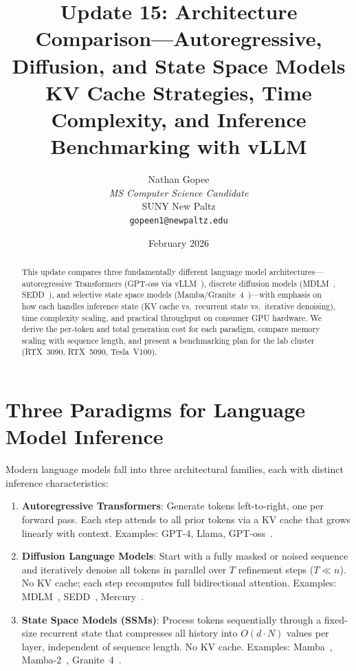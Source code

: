 \documentclass[11pt,letterpaper]{article}
\title{
    \vspace{-1cm}
    \textbf{Update 15: Architecture Comparison---Autoregressive, Diffusion, and State Space Models} \\[0.5em]
    \large KV Cache Strategies, Time Complexity, and Inference Benchmarking with vLLM
}
\author{
    Nathan Gopee \\
    \textit{MS Computer Science Candidate} \\
    SUNY New Paltz \\
    \texttt{gopeen1@newpaltz.edu}
}
\date{February 2026}
\begin{document}
\maketitle

\begin{abstract}
\noindent
This update compares three fundamentally different language model architectures---autoregressive Transformers (GPT-oss via vLLM~\cite{vllm,gptoss}), discrete diffusion models (MDLM~\cite{mdlm}, SEDD~\cite{sedd}), and selective state space models (Mamba/Granite~4~\cite{mamba,granite})---with emphasis on how each handles inference state (KV cache vs.\ recurrent state vs.\ iterative denoising), time complexity scaling, and practical throughput on consumer GPU hardware. We derive the per-token and total generation cost for each paradigm, compare memory scaling with sequence length, and present a benchmarking plan for the lab cluster (RTX~3090, RTX~5090, Tesla~V100).
\end{abstract}

\section{Three Paradigms for Language Model Inference}

Modern language models fall into three architectural families, each with distinct inference characteristics:

\begin{enumerate}[noitemsep]
    \item \textbf{Autoregressive Transformers}: Generate tokens left-to-right, one per forward pass. Each step attends to all prior tokens via a KV cache that grows linearly with context. Examples: GPT-4, Llama, GPT-oss~\cite{gptoss}.

    \item \textbf{Diffusion Language Models}: Start with a fully masked or noised sequence and iteratively denoise all tokens in parallel over $T$ refinement steps ($T \ll n$). No KV cache; each step recomputes full bidirectional attention. Examples: MDLM~\cite{mdlm}, SEDD~\cite{sedd}, Mercury~\cite{mercury}.

    \item \textbf{State Space Models (SSMs)}: Process tokens sequentially through a fixed-size recurrent state that compresses all history into $O(d \cdot N)$ values per layer, independent of sequence length. No KV cache. Examples: Mamba~\cite{mamba}, Mamba-2~\cite{mamba2}, Granite~4~\cite{granite}.
\end{enumerate}
\end{document}

